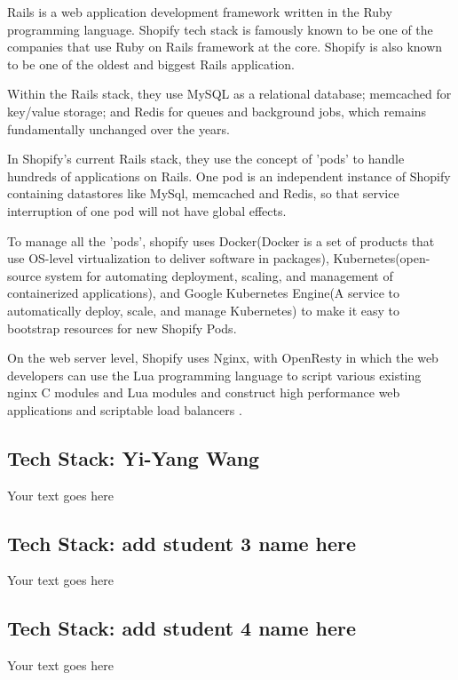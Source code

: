 \documentclass[a4paper, 11pt]{report}
\begin{document}
Rails is a web application development framework written in the Ruby programming language. Shopify tech stack is famously known to be one of the companies that use Ruby on Rails framework at the core. Shopify is also known to be one of the oldest and biggest Rails application. 

Within the Rails stack, they use MySQL as a relational database; memcached for key/value storage; and Redis for queues and background jobs, which remains fundamentally unchanged over the years.

In Shopify's current Rails stack, they use the concept of 'pods' to handle hundreds of applications on Rails. One pod is an independent instance of Shopify containing datastores like MySql, memcached and Redis, so that service interruption of one pod will not have global effects.

To manage all the 'pods', shopify uses Docker(Docker is a set of products that use OS-level virtualization to deliver software in packages), Kubernetes(open-source system for automating deployment, scaling, and management of containerized applications), and Google Kubernetes Engine(A service to automatically deploy, scale, and manage Kubernetes) to make it easy to bootstrap resources for new Shopify Pods.

On the web server level, Shopify uses Nginx, with OpenResty in which the web developers can use the Lua programming language to script various existing nginx C modules and Lua modules and construct high performance web applications and scriptable load balancers \cite{Shatrov2018}.

\subsection{Tech Stack: Yi-Yang Wang}

Your text goes here

\subsection{Tech Stack: add student 3 name here}

Your text goes here

\subsection{Tech Stack: add student 4 name here}

Your text goes here


\end{document}
